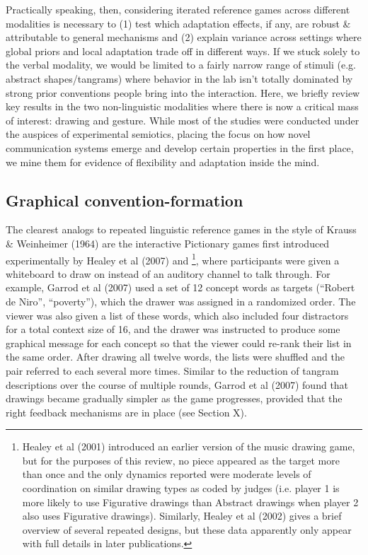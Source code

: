 \documentclass[11pt, floatsintext, jou]{apa6}
\begin{document}
Practically speaking, then, considering iterated reference games across different modalities is necessary to (1) test which adaptation effects, if any, are robust \& attributable to general mechanisms and (2) explain variance across settings where global priors and local adaptation trade off in different ways. If we stuck solely to the verbal modality, we would be limited to a fairly narrow range of stimuli (e.g. abstract shapes/tangrams) where behavior in the lab isn't totally dominated by strong prior conventions people bring into the interaction. Here, we briefly review key results in the two non-linguistic modalities where there is now a critical mass of interest: drawing and gesture. While most of the studies were conducted under the auspices of experimental semiotics, placing the focus on how novel communication systems emerge and develop certain properties in the first place, we mine them for evidence of flexibility and adaptation inside the mind. 

\subsection{Graphical convention-formation}

The clearest analogs to repeated linguistic reference games in the style of Krauss \& Weinheimer (1964) are the interactive Pictionary games first introduced experimentally by Healey et al (2007) and 
\footnote{Healey et al (2001) introduced an earlier version of the music drawing game, but for the purposes of this review, no piece appeared as the target more than once and the only dynamics reported were moderate levels of coordination on similar drawing types as coded by judges (i.e. player 1 is more likely to use Figurative drawings than Abstract drawings when player 2 also uses Figurative drawings). Similarly, Healey et al (2002) gives a brief overview of several repeated designs, but these data apparently only appear with full details in later publications.
}, 
where participants were given a whiteboard to draw on instead of an auditory channel to talk through. For example, Garrod et al (2007) used a set of 12 concept words as targets (``Robert de Niro'', ``poverty''), which the drawer was assigned in a randomized order. The viewer was also given a list of these words, which also included four distractors for a total context size of 16, and the drawer was instructed to produce some graphical message for each concept so that the viewer could re-rank their list in the same order. After drawing all twelve words, the lists were shuffled and the pair referred to each several more times. Similar to the reduction of tangram descriptions over the course of multiple rounds, Garrod et al (2007) found that drawings became gradually simpler as the game progresses, provided that the right feedback mechanisms are in place (see Section X). 
\end{document}
